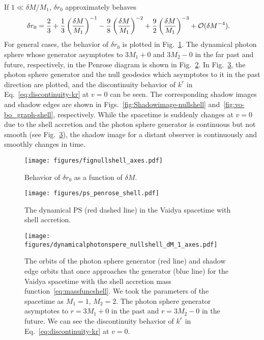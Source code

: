 \documentclass[prd,showpacs,preprintnumbers,groupedaddress,superscriptaddress,nofootinbib,11pt]{revtex4-1} %
\theoremstyle{newplain}
\begin{document}
If $1 \ll \delta M/M_1$,
$\delta r_0$  approximately behaves
\begin{align}
\delta r_0 &= 
\frac{2}{3}
+
\frac{1}{3}\left(\frac{\delta M}{M_1}\right)^{-1}
-
\frac{9}{8}\left(\frac{\delta M}{M_1}\right)^{-2}
+
\frac{9}{2}\left(\frac{\delta M}{M_1}\right)^{-3}
+ {\cal O}(\delta M^{-4}).
\end{align}
For general cases, the behavior of $\delta r_0$ is plotted in Fig.~\ref{fig:nullshell}.
The dynamical photon sphere whose generator asymptotes to $3M_1+0$ and $3M_2-0$ in the far past and future, respectively, in the Penrose diagram is shown in Fig.~\ref{fig:ps-penrose-shell}.
In Fig.~\ref{fig:psgenerator-nullshell}, 
the photon sphere generator and the null geodesics which asymptotes to it in the past direction are plotted, and 
the discontinuity behavior of $k^r$ in Eq.~\eqref{eq:discontinuity-kr} at $v = 0$ can be seen.
The corresponding shadow images and shadow edges are shown in Figs.~\ref{fig:Shadowimage-nullshell} and~\ref{fig:vo-bo_graph-shell}, respectively.
While the spacetime is suddenly changes at $v = 0$ due to the shell accretion 
and the photon sphere generator is continuous but not smooth (see Fig.~\ref{fig:psgenerator-nullshell}),
the shadow image for a distant observer is continuously and smoothly changes in time.
\begin{figure}[h]
\centering
\texttt{[image: figures/fignullshell\_axes.pdf]}
\caption{
\label{fig:nullshell}
Behavior of $\delta r_0$ as a function of $\delta M$.
}
\end{figure}
\begin{figure}[t]
\texttt{[image: figures/ps\_penrose\_shell.pdf]}
\caption{\label{fig:ps-penrose-shell}
The dynamical PS (red dashed line) in the Vaidya spacetime with shell accretion.}
\end{figure}

\begin{figure}[t]
\texttt{[image: figures/dynamicalphotonspere\_nullshell\_dM\_1\_axes.pdf]}
\caption{\label{fig:psgenerator-nullshell} 
The orbits of the photon sphere generator (red line) and shadow edge orbits that once approaches the generator (blue line)
for the Vaidya spacetime with the shell accretion mass function~\eqref{eq:massfuncshell}.
We took the parameters of the spacetime as $M_1=1$, $M_2=2$.
The photon sphere generator asymptotes to $r=3M_1+0$ in the past and $r=3M_2-0$ in the future.
We can see the discontinuity behavior of $k^r$ in Eq.~\eqref{eq:discontinuity-kr} at $v = 0$.
}
\end{figure}
\end{document}
